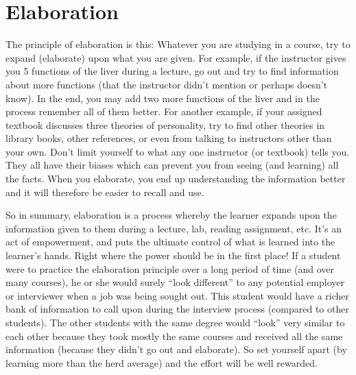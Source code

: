 \chapter{Elaboration}

The principle of elaboration is this: Whatever you are studying in a course, try to expand (elaborate) upon what you are given. For example, if the instructor gives you 5 functions of the liver during a lecture, go out and try to find information about more functions (that the instructor didn't mention or perhaps doesn't know). In the end, you may add two more functions of the liver and in the process remember all of them better. For another example, if your assigned textbook discusses three theories of personality, try to find other theories in library books, other references, or even from talking to instructors other than your own. Don't limit yourself to what any one instructor (or textbook) tells you. They all have their biases which can prevent you from seeing (and learning) all the facts. When you elaborate, you end up understanding the information better and it will therefore be easier to recall and use.

So in summary, elaboration is a process whereby the learner expands upon the information given to them during a lecture, lab, reading assignment, etc. It's an act of empowerment, and puts the ultimate control of what is learned into the learner's hands. Right where the power should be in the first place! If a student were to practice the elaboration principle over a long period of time (and over many courses), he or she would surely ``look different'' to any potential employer or interviewer when a job was being sought out. This student would have a richer bank of information to call upon during the interview process (compared to other students). The other students with the same degree would ``look'' very similar to each other because they took mostly the same courses and received all the same information (because they didn't go out and elaborate). So set yourself apart (by learning more than the herd average) and the effort will be well rewarded.